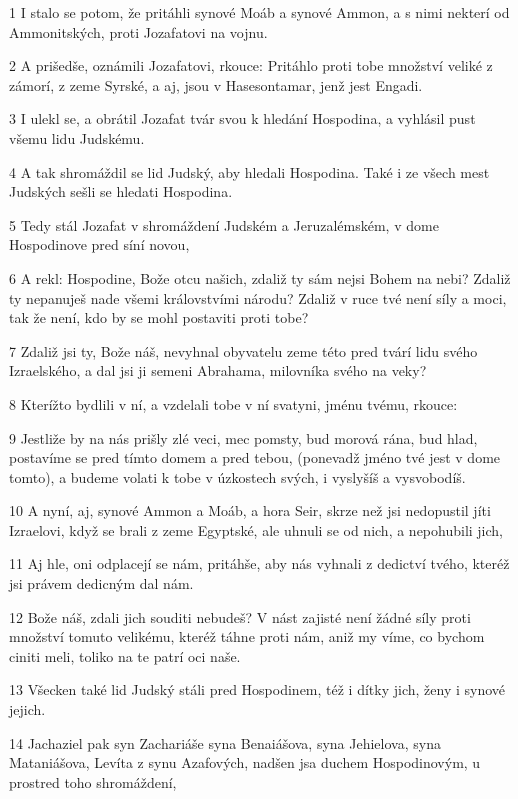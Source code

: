 \par 1 I stalo se potom, že pritáhli synové Moáb a synové Ammon, a s nimi nekterí od Ammonitských, proti Jozafatovi na vojnu.
\par 2 A prišedše, oznámili Jozafatovi, rkouce: Pritáhlo proti tobe množství veliké z zámorí, z zeme Syrské, a aj, jsou v Hasesontamar, jenž jest Engadi.
\par 3 I ulekl se, a obrátil Jozafat tvár svou k hledání Hospodina, a vyhlásil pust všemu lidu Judskému.
\par 4 A tak shromáždil se lid Judský, aby hledali Hospodina. Také i ze všech mest Judských sešli se hledati Hospodina.
\par 5 Tedy stál Jozafat v shromáždení Judském a Jeruzalémském, v dome Hospodinove pred síní novou,
\par 6 A rekl: Hospodine, Bože otcu našich, zdaliž ty sám nejsi Bohem na nebi? Zdaliž ty nepanuješ nade všemi královstvími národu? Zdaliž v ruce tvé není síly a moci, tak že není, kdo by se mohl postaviti proti tobe?
\par 7 Zdaliž jsi ty, Bože náš, nevyhnal obyvatelu zeme této pred tvárí lidu svého Izraelského, a dal jsi ji semeni Abrahama, milovníka svého na veky?
\par 8 Kterížto bydlili v ní, a vzdelali tobe v ní svatyni, jménu tvému, rkouce:
\par 9 Jestliže by na nás prišly zlé veci, mec pomsty, bud morová rána, bud hlad, postavíme se pred tímto domem a pred tebou, (ponevadž jméno tvé jest v dome tomto), a budeme volati k tobe v úzkostech svých, i vyslyšíš a vysvobodíš.
\par 10 A nyní, aj, synové Ammon a Moáb, a hora Seir, skrze než jsi nedopustil jíti Izraelovi, když se brali z zeme Egyptské, ale uhnuli se od nich, a nepohubili jich,
\par 11 Aj hle, oni odplacejí se nám, pritáhše, aby nás vyhnali z dedictví tvého, kteréž jsi právem dedicným dal nám.
\par 12 Bože náš, zdali jich souditi nebudeš? V nást zajisté není žádné síly proti množství tomuto velikému, kteréž táhne proti nám, aniž my víme, co bychom ciniti meli, toliko na te patrí oci naše.
\par 13 Všecken také lid Judský stáli pred Hospodinem, též i dítky jich, ženy i synové jejich.
\par 14 Jachaziel pak syn Zachariáše syna Benaiášova, syna Jehielova, syna Mataniášova, Levíta z synu Azafových, nadšen jsa duchem Hospodinovým, u prostred toho shromáždení,
